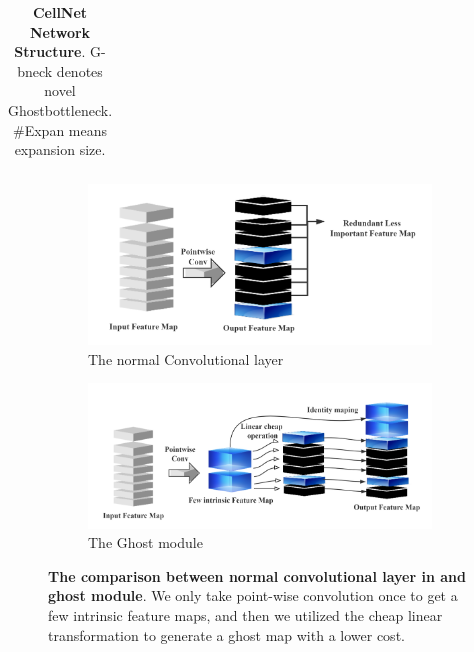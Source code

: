 {\begin{table}[htbp]
{\begin{tabular}{@{}llllllll@{}}
\end{tabular}}
\caption{\textbf{CellNet Network Structure}. G-bneck denotes novel Ghostbottleneck. \#Expan means expansion size.}
\end{table}

\begin{figure}[h]
	\begin{center}
		\begin{subfigure}[b]{0.49\textwidth}
			\includegraphics[width=\textwidth]{thesis-template-master/images/normal conv.png}
			\caption{The normal Convolutional layer}
			\label{fig:res18}
		\end{subfigure}
		\begin{subfigure}[b]{0.49\textwidth}
		    \centering
			\includegraphics[width=\textwidth]{thesis-template-master/images/ghostmodule.png}
			\caption{The Ghost module}
			\label{fig:cellnet}
		\end{subfigure}
	\end{center}
	\caption{\textbf{The comparison between normal convolutional layer in \cite{26}\cite{27}\cite{28} and ghost module}. We only take point-wise convolution once to get a few intrinsic feature maps, and then we utilized the cheap linear transformation to generate a ghost map with a lower cost.}
\end{figure}



}
